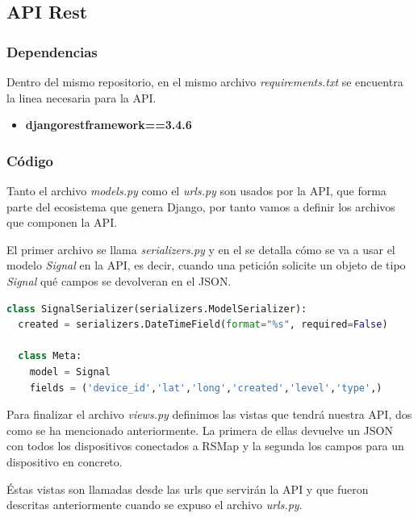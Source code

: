 \subsection{API Rest}

\subsubsection{Dependencias}

Dentro del mismo repositorio, en el mismo archivo \textit{requirements.txt} se encuentra la linea necesaria para la API.

\begin{itemize}
	\item \textbf{djangorestframework==3.4.6}
\end{itemize}

\subsubsection{Código}

Tanto el archivo \textit{models.py} como el \textit{urls.py} son usados por la API, que forma parte del ecosistema que genera Django, por tanto vamos a definir los archivos que componen la API.

\bigskip

El primer archivo se llama \textit{serializers.py} y en el se detalla cómo se va a usar el modelo \textit{Signal} en la API, es decir, cuando una petición solicite un objeto de tipo \textit{Signal} qué campos se devolveran en el JSON.

\begin{lstlisting}[language=python,caption={Serializador del modelo Signal},label={lst:pi1}]
class SignalSerializer(serializers.ModelSerializer):
  created = serializers.DateTimeField(format="%s", required=False)

  class Meta:
    model = Signal
    fields = ('device_id','lat','long','created','level','type',)
\end{lstlisting}

\bigskip

Para finalizar el archivo \textit{views.py} definimos las vistas que tendrá nuestra API, dos como se ha mencionado anteriormente. La primera de ellas devuelve un JSON con todos los dispositivos conectados a RSMap y la segunda los campos para un dispositivo en concreto.

Éstas vistas son llamadas desde las urls que servirán la API y que fueron descritas anteriormente cuando se expuso el archivo \textit{urls.py}.

